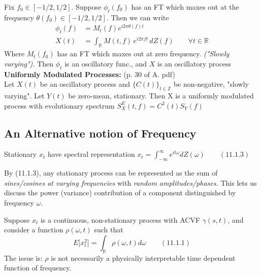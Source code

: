 Fix $f_0\in [-1/2, 1/2]$. Suppose $\phi_t(f_0)$ has an FT which maxes out at the frequency $\theta(f_0) \in [-1/2, 1/2]$. Then we can write 
\begin{align*}
    \phi_t(f) &= M_t(f)e^{i2\pi\theta(f)t} \\
         X(t) &= \int_{\mathbb{R}} M(t,f)\, e^{i2\pi ft}\, dZ(f) \qquad \forall t\in\mathbb{R}
\end{align*}
Where $M_t(f_0)$ has an FT which maxes out at zero frequency. \textit{("Slowly varying").} Then $\phi_t$ is an oscillatory func., and $X$ is an oscillatory process \\

\colorbox{bzadeh}{\color{black}\textbf{Uniformly Modulated Processes:}}  (p. 30 of A. pdf)\\
Let $X(t)$ be an oscillatory process and $\{C(t)\}_{t\in\mathbb Z}$ be non-negative, "slowly varying". Let $Y(t)$ be zero-mean, stationary. Then X is a uniformly modulated process with evolutionary spectrum $S^E_X(t,f) = C^2(t)S_Y(f)$ \\

\color{black} \subsection{An Alternative notion of Frequency} \color{priest}
Stationary $x_t$ have spectral representation $x_t = \int_{-\infty}^\infty e^{it\omega}dZ(\omega)\qquad (11.1.3)$

By (11.1.3), any stationary process can be represented as the sum of \textit{sines/cosines at varying frequencies} with \textit{random amplitudes/phases.} This lets us discuss the power (variance) contribution of a component distinguished by frequency $\omega$. 

Suppose $x_t$ is a continuous, non-stationary process with ACVF $\gamma(s,t)$, and consider a function $\rho(\omega,t)$ such that \[ E\Big[x^2_t\Big] = \int_{\mathbb{R}} \rho(\omega,t) d\omega \qquad (11.1.1) \] The issue is: $\rho$ is not necessarily a physically interpretable time dependent function of frequency.\\

